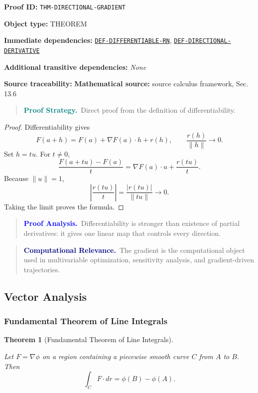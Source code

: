 \documentclass[10pt]{article}
\newcommand{\pidraw}[1]{\begingroup\urlstyle{tt}\nolinkurl{#1}\endgroup}
\newcommand{\pidref}[1]{\hyperref[prf:#1]{\pidraw{#1}}}
\newtheorem{theorem}{Theorem}[section]
\theoremstyle{definition}
\theoremstyle{remark}
\newenvironment{proofstrategy}
{\begin{quote}\small\noindent\textbf{\textcolor{teal}{Proof Strategy.}}\ }
{\end{quote}}
\newenvironment{proofanalysis}
{\begin{quote}\small\noindent\textbf{\textcolor{blue}{Proof Analysis.}}\ }
{\end{quote}}
\newenvironment{computationalrelevance}
{\begin{quote}\small\noindent\textbf{\textcolor{navy}{Computational Relevance.}}\ }
{\end{quote}}
\newcommand{\meta}[2]{\noindent\textbf{#1:} #2\par}
\begin{document}
\meta{Proof ID}{\pidraw{THM-DIRECTIONAL-GRADIENT}}
\meta{Object type}{THEOREM}
\meta{Immediate dependencies}{\pidref{DEF-DIFFERENTIABLE-RN}, \pidref{DEF-DIRECTIONAL-DERIVATIVE}}
\meta{Additional transitive dependencies}{\emph{None}}
\meta{Source traceability}{\textbf{Mathematical source:} source calculus framework, Sec. 13.6}

\begin{proofstrategy}Direct proof from the definition of differentiability.\end{proofstrategy}

\begin{proof}

Differentiability gives
\[
F(a+h)=F(a)+\nabla F(a)\cdot h+r(h),
\qquad
\frac{r(h)}{\|h\|}\to0.
\]
Set $h=tu$. For $t\ne0$,
\[
\frac{F(a+tu)-F(a)}{t}
=
\nabla F(a)\cdot u+\frac{r(tu)}{t}.
\]
Because $\|u\|=1$,
\[
\left|\frac{r(tu)}{t}\right|
=
\frac{|r(tu)|}{\|tu\|}\to0.
\]
Taking the limit proves the formula.

\end{proof}

\begin{proofanalysis}Differentiability is stronger than existence of partial derivatives: it gives one linear map that controls every direction.\end{proofanalysis}

\begin{computationalrelevance}The gradient is the computational object used in multivariable optimization, sensitivity analysis, and gradient-driven trajectories.\end{computationalrelevance}

\subsection{Vector Analysis}

\subsubsection{Fundamental Theorem of Line Integrals}

\begin{theorem}[Fundamental Theorem of Line Integrals]\label{prf:THM-FUNDAMENTAL-LINE-INTEGRAL}

Let $F=\nabla\phi$ on a region containing a piecewise smooth curve $C$ from $A$ to $B$. Then
\[
\int_C F\cdot dr=\phi(B)-\phi(A).
\]

\end{theorem}
\end{document}

